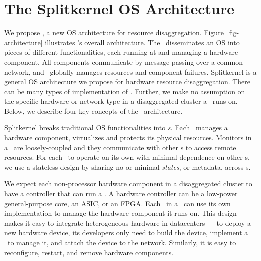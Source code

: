 \section{The Splitkernel OS Architecture}
\label{sec:design}

We propose {\em \splitkernel}, a new OS architecture for resource disaggregation. 
Figure~\ref{fig-architecture} illustrates \splitkernel's overall architecture.
The \splitkernel\ disseminates an OS into pieces of different functionalities,
each running at and managing a hardware component.
All components communicate by message passing over a common network,
and \splitkernel\ globally manages resources and component failures.
Splitkernel is a general OS architecture we propose for hardware resource disaggregation.
There can be many types of implementation of \splitkernel.
Further, we make no assumption on the specific hardware or network type in a disaggregated cluster a \splitkernel\ runs on.
Below, we describe four key concepts of the \splitkernel\ architecture.

Splitkernel breaks traditional OS functionalities into {\em \microos{}s}.
Each \microos\ manages a hardware component, virtualizes and protects its physical resources.
Monitors in a \splitkernel\ are loosely-coupled and 
they communicate with other \microos{}s to access remote resources. 
For each \microos\ to operate on its own with minimal dependence on other \microos{}s,
we use a stateless design by sharing no or minimal {\em states}, or metadata,
across \microos{}s.

We expect each non-processor hardware component in a disaggregated cluster to have a controller that 
can run a \microos.
A hardware controller can be a low-power general-purpose core, an ASIC, or an FPGA.
Each \microos\ in a \splitkernel\ can use its own implementation to manage the hardware component it runs on.
This design makes it easy to integrate heterogeneous hardware in datacenters ---
to deploy a new hardware device, its developers only need to build the device,
implement a \microos\ to manage it, %
and attach the device to the network. 
Similarly, it is easy to reconfigure, restart, and remove hardware components.

